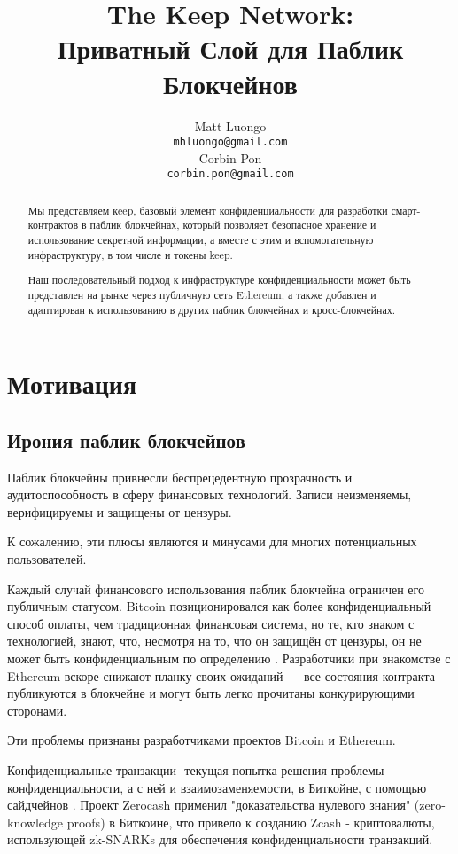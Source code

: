 \documentclass[english,main=russian,11pt]{article}
\title{The Keep Network:\protect\\Приватный Слой для Паблик Блокчейнов}
\author{Matt Luongo \\
  {\tt mhluongo@gmail.com} \\\And
  Corbin Pon \\
  {\tt corbin.pon@gmail.com} \\}
\date{}
\begin{document}
\thispagestyle{fancy}

\maketitle

\begin{abstract}

  Мы представляем кeep, базовый элемент конфиденциальности 
  для разработки смарт-контрактов в паблик блокчейнах, который 
  позволяет безопасное хранение и использование секретной 
  информации, а вместе с этим и вспомогательную  инфраструктуру, 
  в том числе и токены keep.

  Наш последовательный подход к инфраструктуре конфиденциальности 
  может быть представлен на рынке через публичную сеть Ethereum, 
  а также добавлен и адaптирован к использованию в других 
  паблик блокчейнах и кросс-блокчейнах.

\end{abstract}

\section{Мотивация}

\subsection{Ирония паблик блокчейнов}

Паблик блокчейны привнесли беспрецедентную прозрачность и 
аудитоспособность в сферу финансовых технологий. 
Записи неизменяемы, верифицируемы и защищены от цензуры.

К сожалению, эти плюсы являются и минусами для многих потенциальных 
пользователей. 

Каждый  случай финансового использования паблик блокчейна ограничен 
его публичным статусом. Bitcoin позиционировался как более 
конфиденциальный способ оплаты, чем традиционная финансовая система, 
но те, кто знаком с технологией, знают, что, несмотря на то, что 
он защищён от цензуры, он не может быть конфиденциальным по 
определению \cite{bitcoinPrivacy}. Разработчики при знакомстве с 
Ethereum вскоре снижают планку своих ожиданий \cite{ethereumStackexchange}— 
все состояния контракта публикуются в блокчейне и могут быть легко 
прочитаны конкурирующими сторонами.

Эти проблемы признаны разработчиками проектов Bitcoin и Ethereum.

Конфиденциальные транзакции \cite{confidentialTransactions}-текущая 
попытка решения проблемы конфиденциальности, а с ней и 
взаимозаменяемости, в Биткойне, с помощью сайдчейнов \cite{confidentialTransactionsElements}. 
Проект Zerocash \cite{zerocash} применил "доказательства нулевого 
знания" (zero-knowledge proofs) в Биткоине, что привело к созданию 
Zcash \cite{zcash}- криптовалюты, использующей zk-SNARKs для 
обеспечения конфиденциальности транзакций.
\end{document}
